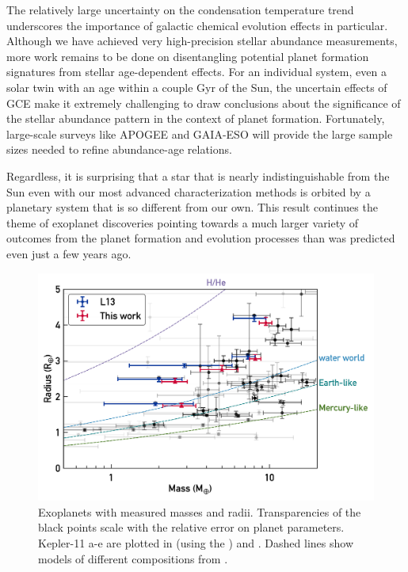 \documentclass[twocolumn,trackchanges]{aastex61}
\begin{document}
The relatively large uncertainty on the condensation temperature trend underscores the importance of galactic chemical evolution effects in particular. Although we have achieved very high-precision stellar abundance measurements, more work remains to be done on disentangling potential planet formation signatures from stellar age-dependent effects. For an individual system, even a solar twin with an age within a couple Gyr of the Sun, the uncertain effects of GCE make it extremely challenging to draw conclusions about the significance of the stellar abundance pattern in the context of planet formation. Fortunately, large-scale surveys like APOGEE and GAIA-ESO will provide the large sample sizes needed to refine  abundance-age relations.

Regardless, it is surprising that a star that is nearly indistinguishable from the Sun even with our most advanced characterization methods is orbited by a planetary system that is so different from our own. This result continues the theme of exoplanet discoveries pointing towards a much larger variety of outcomes from the planet formation and evolution processes than was predicted even just a few years ago.

\begin{figure}
\centering
\includegraphics[scale=0.6]{K11_massradius}
\caption{Exoplanets with measured masses and radii. Transparencies of the black points scale with the relative error on planet parameters. Kepler-11 a-e are plotted in  (using the ) and  . Dashed lines show models of different compositions from \citet{Seager2007}.}
\label{fig:mr}
\end{figure}
\end{document}
